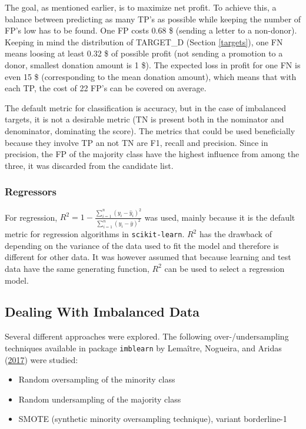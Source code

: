 \documentclass[
  11pt,
  a4paper,
  DIV=12,captions=tableheading,oneside,titlepage]{scrbook}
\providecommand{\tightlist}{%
  \setlength{\itemsep}{0pt}\setlength{\parskip}{0pt}}
\begin{document}
The goal, as mentioned earlier, is to maximize net profit. To achieve this, a balance between predicting as many TP's as possible while keeping the number of FP's low has to be found. One FP costs 0.68 \$ (sending a letter to a non-donor). Keeping in mind the distribution of TARGET\_D (Section \ref{targets}), one FN means loosing at least 0.32 \$ of possible profit (not sending a promotion to a donor, smallest donation amount is 1 \$). The expected loss in profit for one FN is even 15 \$ (corresponding to the mean donation amount), which means that with each TP, the cost of 22 FP's can be covered on average.

The default metric for classification is accuracy, but in the case of imbalanced targets, it is not a desirable metric (TN is present both in the nominator and denominator, dominating the score). The metrics that could be used beneficially because they involve TP an not TN are F1, recall and precision. Since in precision, the FP of the majority class have the highest influence from among the three, it was discarded from the candidate list.

\hypertarget{regressors}{%
\subsubsection{Regressors}\label{regressors}}

For regression, \(R^2 = 1- \frac{\sum_{i=1}^n(y_i-\hat{y}_i)^2}{\sum_{i=1}^n(y_i-\bar{y})^2}\) was used, mainly because it is the default metric for regression algorithms in \texttt{scikit-learn}. \(R^2\) has the drawback of depending on the variance of the data used to fit the model and therefore is different for other data. It was however assumed that because learning and test data have the same generating function, \(R^2\) can be used to select a regression model.

\hypertarget{imblearn}{%
\subsection{Dealing With Imbalanced Data}\label{imblearn}}

Several different approaches were explored. The following over-/undersampling techniques available in package \texttt{imblearn} by Lemaître, Nogueira, and Aridas (\protect\hyperlink{ref-lemaitre2017imblearn}{2017}) were studied:

\begin{itemize}
\tightlist
\item
  Random oversampling of the minority class
\item
  Random undersampling of the majority class
\item
  SMOTE (synthetic minority oversampling technique), variant borderline-1
\end{itemize}
\end{document}
